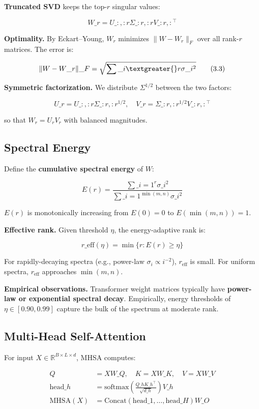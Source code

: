 \textbf{Truncated SVD} keeps the top-$r$ singular values:

\[
W\_r = U\_{:, :r} \Sigma\_{:r, :r} V\_{:r, :}^\top
\tag{3.2}
\]

\textbf{Optimality.} By Eckart--Young, $W_r$ minimizes $\|W - W_r\|_F$ over all 
rank-$r$ matrices. The error is:

\[
\|W - W\_r\|\_F = \sqrt{\sum\_{i \textgreater{} r} \sigma\_i^2}
\tag{3.3}
\]

\textbf{Symmetric factorization.} We distribute $\Sigma^{1/2}$ between the two 
factors:

\[
U\_r = U\_{:, :r} \Sigma\_{:r, :r}^{1/2}, \quad
V\_r = \Sigma\_{:r, :r}^{1/2} V\_{:r, :}^\top
\tag{3.4}
\]

so that $W_r = U_r V_r$ with balanced magnitudes.

\subsection{Spectral Energy}

Define the \textbf{cumulative spectral energy} of $W$:

\[
E(r) = \frac{\sum\_{i=1}^{r} \sigma\_i^2}{\sum\_{i=1}^{\min(m, n)} \sigma\_i^2}
\tag{3.5}
\]

$E(r)$ is monotonically increasing from $E(0) = 0$ to $E(\min(m, n)) = 1$.

\textbf{Effective rank.} Given threshold $\eta$, the energy-adaptive rank is:

\[
r\_\text{eff}(\eta) = \min\{r : E(r) \geq \eta\}
\tag{3.6}
\]

For rapidly-decaying spectra (e.g., power-law $\sigma_i \propto i^{-2}$), 
$r_\text{eff}$ is small. For uniform spectra, $r_\text{eff}$ approaches 
$\min(m, n)$.

\textbf{Empirical observations.} Transformer weight matrices typically have 
\textbf{power-law or exponential spectral decay}. Empirically, energy thresholds 
of $\eta \in [0.90, 0.99]$ capture the bulk of the spectrum at moderate rank.

\subsection{Multi-Head Self-Attention}

For input $X \in \mathbb{R}^{B \times L \times d}$, MHSA computes:

\[
\begin{aligned}
Q &= X W\_Q, \quad K = X W\_K, \quad V = X W\_V \\
\text{head}\_h &= \text{softmax}\!\left(\frac{Q\_h K\_h^\top}{\sqrt{d\_h}}\right) V\_h \\
\text{MHSA}(X) &= \text{Concat}(\text{head}\_1, \dots, \text{head}\_H) W\_O
\end{aligned}
\tag{3.7}
\]

